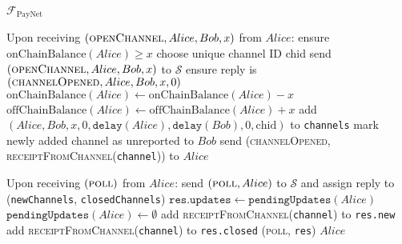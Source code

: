 \begin{functionality}{$\mathcal{F}_{\mathrm{PayNet}}$}
\begin{algorithmic}[1]
    \State Upon receiving $\left(\textsc{openChannel}, Alice, Bob, x\right)$
    from $Alice$:
    \Indent
      \State ensure $\mathrm{onChainBalance}\left(Alice\right) \geq x$
      \State choose unique channel ID chid
      \State send $\left(\textsc{openChannel}, Alice, Bob, x\right)$ to
      $\mathcal{S}$
      \State ensure reply is $\left(\textsc{channelOpened}, Alice, Bob, x,
      0\right)$
      \State $\mathrm{onChainBalance}\left(Alice\right) \gets
      \mathrm{onChainBalance}\left(Alice\right) - x$
      \State $\mathrm{offChainBalance}\left(Alice\right) \gets
      \mathrm{offChainBalance}\left(Alice\right) + x$
      \State add $\left(Alice, Bob, x, 0, \mathtt{delay}\left(Alice\right),
      \mathtt{delay}\left(Bob\right), 0, \mathrm{chid}\right)$ to
      \texttt{channels}
      \State mark newly added channel as unreported to $Bob$
      \State send (\textsc{channelOpened},
      \textsc{receiptFromChannel}(\texttt{channel})) to $Alice$
    \EndIndent
    \State

    \State Upon receiving $\left(\textsc{poll}\right)$ from $Alice$:
    \Indent
      \State send $\left(\textsc{poll}, Alice\right)$ to $\mathcal{S}$
      and assign reply to (\texttt{newChannels}, \texttt{closedChannels})
      \State $\mathtt{res.updates} \gets
      \mathtt{pendingUpdates}\left(Alice\right)$
      \State $\mathtt{pendingUpdates}\left(Alice\right) \gets \emptyset$
        \State add \textsc{receiptFromChannel}(\texttt{channel}) to
        \texttt{res.new}
      \EndFor
        \State add \textsc{receiptFromChannel}(\texttt{channel}) to
        \texttt{res.closed}
      \EndFor
      \State \Return (\textsc{poll}, \texttt{res}) $Alice$
    \EndIndent


\end{algorithmic}
\end{functionality}
